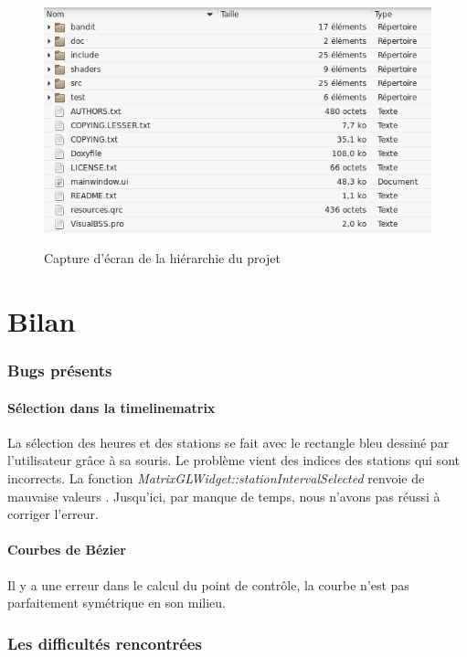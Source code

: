 \documentclass[12pt]{article}
\begin{document}
	\begin{figure}[!h]
	\begin{center}
	\includegraphics[scale=.6]{screen_hierarchie_projet.png}\\
	\caption{Capture d'écran de la hiérarchie du projet}
	\end{center}
	\end{figure}

		
\clearpage
\newpage
\part{Bilan}
	\section{Bugs présents}		
		\subsection{Sélection dans la timelinematrix}
		La sélection des heures et des stations se fait avec le rectangle bleu dessiné par
		l'utilisateur grâce à sa souris. Le problème vient des indices des stations qui
		sont incorrects.
		La fonction \textit{MatrixGLWidget::stationIntervalSelected} renvoie de mauvaise valeurs
		. Jusqu'ici, par manque de temps, nous n'avons pas réussi à corriger l'erreur.
		
		\subsection{Courbes de Bézier}
		Il y a une erreur dans le calcul du point de contrôle, la courbe n'est pas parfaitement
		symétrique en son milieu.
		
	\newpage
	\section{Les difficultés rencontrées}
\end{document}
